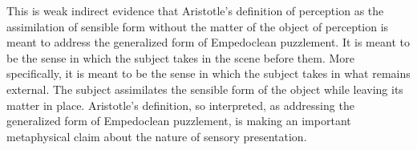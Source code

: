This is weak indirect evidence that Aristotle's definition of perception as the assimilation of sensible form without the matter of the object of perception is meant to address the generalized form of Empedoclean puzzlement. It is meant to be the sense in which the subject takes in the scene before them. More specifically, it is meant to be the sense in which the subject takes in what remains external. The subject assimilates the sensible form of the object while leaving its matter in place. Aristotle's definition, so interpreted, as addressing the generalized form of Empedoclean puzzlement, is making an important metaphysical claim about the nature of sensory presentation.




